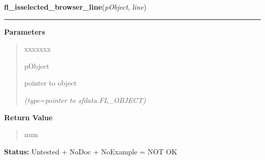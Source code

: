 \hspace{.8\funcindent}\begin{boxedminipage}{\funcwidth}

    \raggedright \textbf{fl\_isselected\_browser\_line}(\textit{pObject}, \textit{line})

    \vspace{-1.5ex}

    \rule{\textwidth}{0.5\fboxrule}
\setlength{\parskip}{2ex}
\setlength{\parskip}{1ex}
      \textbf{Parameters}
      \vspace{-1ex}

      \begin{quote}
        \begin{Ventry}{xxxxxxx}

          \item[pObject]

          pointer to object

            {\it (type=pointer to xfdata.FL\_OBJECT)}

        \end{Ventry}

      \end{quote}

      \textbf{Return Value}
    \vspace{-1ex}

      \begin{quote}
      num

      \end{quote}

\textbf{Status:} Untested + NoDoc + NoExample = NOT OK



    \end{boxedminipage}

    \label{xformslib:library:fl_get_browser_topline}

    \vspace{0.5ex}

